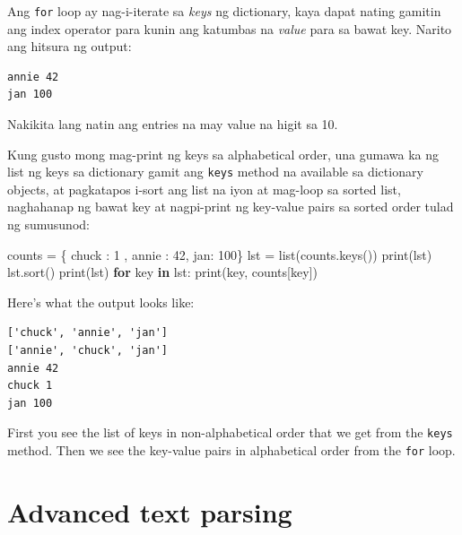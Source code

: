 \documentclass[10pt,]{book}
\newenvironment{Shaded}{}{}
\newcommand{\BuiltInTok}[1]{\textcolor[rgb]{0.00,0.50,0.00}{#1}}
\newcommand{\ControlFlowTok}[1]{\textcolor[rgb]{0.00,0.44,0.13}{\textbf{#1}}}
\newcommand{\DecValTok}[1]{\textcolor[rgb]{0.25,0.63,0.44}{#1}}
\newcommand{\KeywordTok}[1]{\textcolor[rgb]{0.00,0.44,0.13}{\textbf{#1}}}
\newcommand{\NormalTok}[1]{#1}
\newcommand{\OperatorTok}[1]{\textcolor[rgb]{0.40,0.40,0.40}{#1}}
\newcommand{\StringTok}[1]{\textcolor[rgb]{0.25,0.44,0.63}{#1}}
\begin{document}
Ang \texttt{for} loop ay nag-i-iterate sa \emph{keys} ng dictionary,
kaya dapat nating gamitin ang index operator para kunin ang katumbas na
\emph{value} para sa bawat key. Narito ang hitsura ng output:

{\small
\begin{verbatim}
annie 42
jan 100
\end{verbatim}
}

Nakikita lang natin ang entries na may value na higit sa 10.

 

Kung gusto mong mag-print ng keys sa alphabetical order, una gumawa ka
ng list ng keys sa dictionary gamit ang \texttt{keys} method na
available sa dictionary objects, at pagkatapos i-sort ang list na iyon
at mag-loop sa sorted list, naghahanap ng bawat key at nagpi-print ng
key-value pairs sa sorted order tulad ng sumusunod:

\begin{Shaded}
\begin{Highlighting}[]
\NormalTok{counts }\OperatorTok{=}\NormalTok{ \{ }\StringTok{\textquotesingle{}chuck\textquotesingle{}}\NormalTok{ : }\DecValTok{1}\NormalTok{ , }\StringTok{\textquotesingle{}annie\textquotesingle{}}\NormalTok{ : }\DecValTok{42}\NormalTok{, }\StringTok{\textquotesingle{}jan\textquotesingle{}}\NormalTok{: }\DecValTok{100}\NormalTok{\}}
\NormalTok{lst }\OperatorTok{=} \BuiltInTok{list}\NormalTok{(counts.keys())}
\BuiltInTok{print}\NormalTok{(lst)}
\NormalTok{lst.sort()}
\BuiltInTok{print}\NormalTok{(lst)}
\ControlFlowTok{for}\NormalTok{ key }\KeywordTok{in}\NormalTok{ lst:}
    \BuiltInTok{print}\NormalTok{(key, counts[key])}
\end{Highlighting}
\end{Shaded}

Here's what the output looks like:

{\small
\begin{verbatim}
['chuck', 'annie', 'jan']
['annie', 'chuck', 'jan']
annie 42
chuck 1
jan 100
\end{verbatim}
}

First you see the list of keys in non-alphabetical order that we get
from the \texttt{keys} method. Then we see the key-value pairs in
alphabetical order from the \texttt{for} loop.

\section{Advanced text parsing}\label{advanced-text-parsing}
\end{document}
